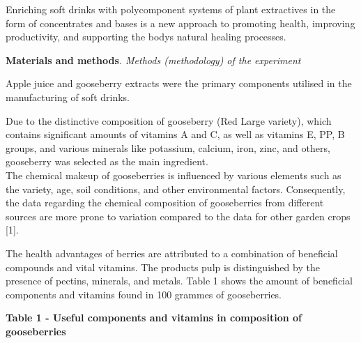 Enriching soft drinks with polycomponent systems of plant extractives in
the form of concentrates and bases is a new approach to promoting
health, improving productivity, and supporting the
body\textquotesingle s natural healing processes.

{\bfseries Materials and methods}\emph{. Methods (methodology) of the
experiment}

Apple juice and gooseberry extracts were the primary components utilised
in the manufacturing of soft drinks.~

Due to the distinctive composition of gooseberry (Red Large variety),
which contains significant amounts of vitamins A and C, as well as
vitamins E, PP, B groups, and various minerals like potassium, calcium,
iron, zinc, and others, gooseberry was selected as the main
ingredient.~\\
The chemical makeup of gooseberries is influenced by various elements
such as the variety, age, soil conditions, and other environmental
factors. Consequently, the data regarding the chemical composition of
gooseberries from different sources are more prone to variation compared
to the data for other garden crops {[}1{]}.~

The health advantages of berries are attributed to a combination of
beneficial compounds and vital vitamins. The product\textquotesingle s
pulp is distinguished by the presence of pectins, minerals, and metals.
Table 1 shows the amount of beneficial components and vitamins found in
100 grammes of gooseberries.

{\bfseries Table 1 - Useful components and vitamins in composition of
gooseberries}

